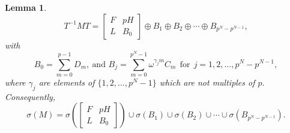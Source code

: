 \documentclass[preprint,12pt]{elsarticle}
\newtheorem{lem}[thm]{Lemma}
\theoremstyle{definition}
\theoremstyle{remark}
\begin{document}
\begin{lem}
\begin{equation}\label{eq:sim_decomp}
T^{-1} M T = \left[\begin{array}{rr} F & pH \\ L & B_0 \end{array}\right]
\oplus B_1 \oplus B_2 \oplus \cdots \oplus B_{p^N-p^{N-1}},
\end{equation}
with
\[
B_0 = \sum_{m=0}^{p-1} D_m, \ \text{and }
B_j = \sum_{m=0}^{p^N-1} \omega^{\gamma_j m}C_m \ \ \text{for} \ \ j = 1,2, \ldots, p^N-p^{N-1}, 
\]
where  $\gamma_j$ are elements of $\{1,2,\dots ,p^N-1\}$ which are not multiples of $p$. Consequently,
\[
\sigma(M) = \sigma\left(\left[\begin{array}{rr} F & pH \\ L & B_0 \end{array}\right] \right)
\cup \sigma(B_1) \cup \sigma(B_2) \cup \cdots \cup \sigma(B_{p^N-p^{N-1}}).
\]
\end{lem}
\end{document}

